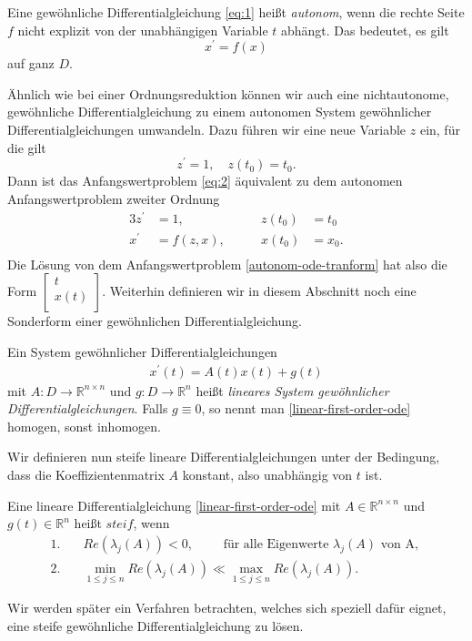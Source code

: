 \begin{definition}
    Eine gewöhnliche Differentialgleichung \eqref{eq:1} heißt {\em autonom}, wenn die rechte Seite $f$ nicht
    explizit von der unabhängigen Variable $t$ abhängt. Das bedeutet, es gilt
    \[
        x^{\prime} = f(x)
    \]
    auf ganz $D$.
\end{definition}
Ähnlich wie bei einer Ordnungsreduktion können wir auch eine nichtautonome, gewöhnliche Differentialgleichung zu einem
autonomen System gewöhnlicher Differentialgleichungen umwandeln. Dazu führen wir eine neue Variable $z$ ein, für die
gilt
\[
    z^{\prime} = 1, \quad z(t_0) = t_0.
\]
Dann ist das Anfangswertproblem \eqref{eq:2} äquivalent zu dem autonomen Anfangswertproblem zweiter Ordnung
\begin{alignat}{3}
    \label{autonom-ode-tranform}
    z^{\prime} &= 1, \qquad &z(t_0) &= t_0 \nonumber\\
    x^{\prime} &= f(z,x),\qquad  &x(t_0) &= x_0. \\
\end{alignat}
Die Lösung von dem Anfangswertproblem \eqref{autonom-ode-tranform} hat also die Form
$\left[ \begin{matrix} t\\ x(t)\\ \end{matrix} \right].$ Weiterhin definieren wir in diesem Abschnitt noch eine
Sonderform einer gewöhnlichen Differentialgleichung.
\begin{definition}
    Ein System gewöhnlicher Differentialgleichungen
    \begin{align}
        \label{linear-first-order-ode}
        x^{\prime}(t) = A(t)x(t) + g(t)
    \end{align}
    mit $A:D \rightarrow \mathbb{R}^{n \times n}$ und $g:D \rightarrow \mathbb{R}^n$ heißt
        {\em lineares System gewöhnlicher Differentialgleichungen}. Falls $g \equiv 0$, so nennt man
    \eqref{linear-first-order-ode} homogen, sonst inhomogen.
\end{definition}
Wir definieren nun steife lineare Differentialgleichungen unter der Bedingung, dass die Koeffizientenmatrix $A$ konstant,
also unabhängig von $t$ ist.
\begin{definition}
    \label{steife-dgl}
    Eine lineare Differentialgleichung \eqref{linear-first-order-ode} mit $A \in \mathbb{R}^{n \times n}$ und
    $g(t) \in \mathbb{R}^n$ heißt $steif$, wenn
    \begin{align*}
        1.& \quad Re(\lambda_j(A)) < 0, \qquad \text{ für alle Eigenwerte } \lambda_j(A) \text{ von A, }\\
        2.& \quad \min\limits_{1 \leq j \leq n} Re(\lambda_j(A)) \ll \max\limits_{1 \leq j \leq n} Re(\lambda_j(A)).
    \end{align*}
\end{definition}
Wir werden später ein Verfahren betrachten, welches sich speziell dafür eignet, eine steife gewöhnliche
Differentialgleichung zu lösen.

